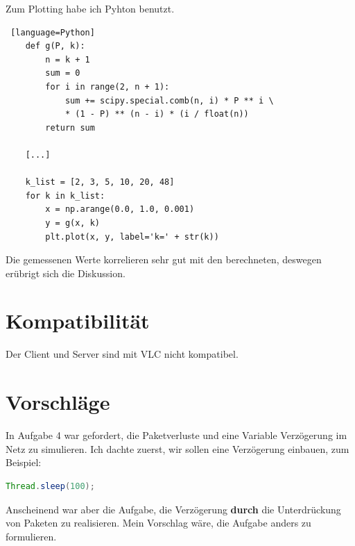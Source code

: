 \documentclass[11pt]{article}
\begin{document}
    \noindent
    Zum Plotting habe ich Pyhton benutzt.

    \begin{lstlisting} [language=Python]
    def g(P, k):
        n = k + 1
        sum = 0
        for i in range(2, n + 1):
            sum += scipy.special.comb(n, i) * P ** i \
            * (1 - P) ** (n - i) * (i / float(n))
        return sum

    [...]

    k_list = [2, 3, 5, 10, 20, 48]
    for k in k_list:
        x = np.arange(0.0, 1.0, 0.001)
        y = g(x, k)
        plt.plot(x, y, label='k=' + str(k))
    \end{lstlisting}

    \noindent
    Die gemessenen Werte korrelieren sehr gut mit den berechneten, deswegen erübrigt sich die Diskussion.

    \section{Kompatibilität}
    Der Client und Server sind mit VLC nicht kompatibel.


    \section{Vorschläge}

    In Aufgabe 4 war gefordert, die Paketverluste und eine Variable Verzögerung im Netz zu simulieren.
    Ich dachte zuerst, wir sollen eine Verzögerung einbauen, zum Beispiel:

    \begin{lstlisting}[language=Java]
        Thread.sleep(100);
    \end{lstlisting}

    \noindent
    Anscheinend war aber die Aufgabe, die Verzögerung \textbf{durch} die Unterdrückung von Paketen zu realisieren.
    Mein Vorschlag wäre, die Aufgabe anders zu formulieren.
\end{document}
